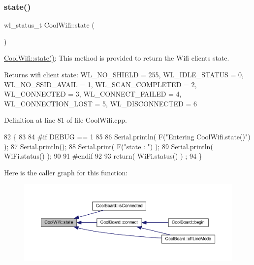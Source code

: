 \subsubsection{\texorpdfstring{state()}{state()}}
{\footnotesize\ttfamily wl\+\_\+status\+\_\+t Cool\+Wifi\+::state (\begin{DoxyParamCaption}{ }\end{DoxyParamCaption})}

\hyperlink{class_cool_wifi_a1c7b4d82a4098d346e7593dce92039fa}{Cool\+Wifi\+::state()}\+: This method is provided to return the Wifi client\textquotesingle{}s state. \begin{DoxyReturn}{Returns}
wifi client state\+: W\+L\+\_\+\+N\+O\+\_\+\+S\+H\+I\+E\+LD = 255, W\+L\+\_\+\+I\+D\+L\+E\+\_\+\+S\+T\+A\+T\+US = 0, W\+L\+\_\+\+N\+O\+\_\+\+S\+S\+I\+D\+\_\+\+A\+V\+A\+IL = 1, W\+L\+\_\+\+S\+C\+A\+N\+\_\+\+C\+O\+M\+P\+L\+E\+T\+ED = 2, W\+L\+\_\+\+C\+O\+N\+N\+E\+C\+T\+ED = 3, W\+L\+\_\+\+C\+O\+N\+N\+E\+C\+T\+\_\+\+F\+A\+I\+L\+ED = 4, W\+L\+\_\+\+C\+O\+N\+N\+E\+C\+T\+I\+O\+N\+\_\+\+L\+O\+ST = 5, W\+L\+\_\+\+D\+I\+S\+C\+O\+N\+N\+E\+C\+T\+ED = 6 
\end{DoxyReturn}


Definition at line 81 of file Cool\+Wifi.\+cpp.


\begin{DoxyCode}
82 \{
83 
84 \textcolor{preprocessor}{#if DEBUG == 1 }
85 
86     Serial.println( F(\textcolor{stringliteral}{"Entering CoolWifi.state()"}) );
87     Serial.println();   
88     Serial.print( F(\textcolor{stringliteral}{"state : "}) );
89     Serial.println( WiFi.status() );
90 
91 \textcolor{preprocessor}{#endif}
92     
93     \textcolor{keywordflow}{return}( WiFi.status() ) ;
94 \}
\end{DoxyCode}
Here is the caller graph for this function\+:\nopagebreak
\begin{figure}[H]
\begin{center}
\leavevmode
\includegraphics[width=350pt]{d7/d29/class_cool_wifi_a1c7b4d82a4098d346e7593dce92039fa_icgraph}
\end{center}
\end{figure}


